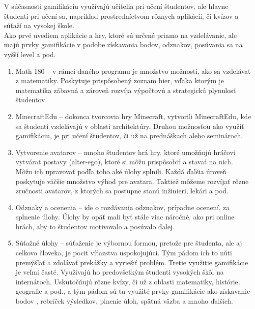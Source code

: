 \documentclass[10pt,slovak,a4paper]{article}
\begin{document}
\indent V súčasnosti gamifikáciu využívajú učitelia pri učení študentov, ale hlavne študenti pri učení sa, napríklad prostredníctvom rôznych aplikácií, či kvízov a súťaží na vysokej škole.\\
\indent Ako prvé uvediem aplikácie a hry, ktoré sú určené priamo na vzdelávanie, ale majú prvky gamifikácie v podobe získavania bodov, odznakov, posúvania sa na vyšší level a pod.
\begin{enumerate}
\item 	Math 180 – v rámci daného programu je množstvo možností, ako sa vzdelávať z matematiky. Poskytuje prispôsobený zoznam hier, vďaka ktorým je matematika zábavná a zároveň rozvíja výpočtovú a strategickú plynulosť študentov.
\cite{cite13}

\item 	MinecraftEdu – dokonca tvorcovia hry Minecraft, vytvorili MinecraftEdu, kde sa študenti vzdelávajú v oblasti architektúry. 
Druhou možnosťou ako využiť gamifikáciu, je pri učení študentov, či už na prednáškach alebo seminároch.
\item Vytvorenie avatarov – mnoho študentov hrá hry, ktoré umožňujú hráčovi vytvárať postavy (alter-ego), ktoré si môžu prispôsobiť a stavať na nich. Môžu ich upravovať podľa toho aké úlohy splnili. Každá ďalšia úroveň poskytuje väčšie množstvo výhod pre avatara. Taktiež môžeme rozvíjať rôzne zručnosti avatarov, z ktorých sa postupne stanú inžinieri, lekári a pod. \cite{cite1}
\item	Odznaky a ocenenia – ide o rozdávania odznakov, prípadne ocenení, za splnenie úlohy. Úlohy by opäť mali byť stále viac náročné, ako pri online hrách, aby to študentov motivovalo a posúvalo ďalej. 
\item	Súťažné úlohy – súťaženie je výbornou formou, pretože pre študenta, ale aj celkovo človeka, je pocit víťazstva uspokojujúci. Tým pádom ich to núti premýšľať a zdolávať prekážky a vyriešiť problém. 
Tretie využitie gamifikácie je veľmi časté. Využívajú ho predovšetkým študenti vysokých škôl na internátoch. Uskutočňujú rôzne kvízy, či už z oblasti matematiky, histórie, geografie a pod., a tým pádom sú tu využité prvky gamifikácie ako získavanie bodov , rebríček výsledkov, plnenie úloh, spätná väzba a mnoho ďalších. 

\end{enumerate}
\end{document}
